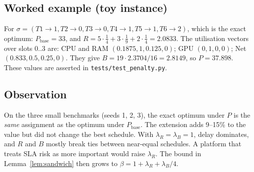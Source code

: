 \subsection{Worked example (toy instance)}
For $\sigma = (T1{\to}1, T2{\to}0, T3{\to}0, T4{\to}1, T5{\to}1, T6{\to}2)$,
which is the exact optimum:
$P_{\text{base}} = 33$, and
$R = 5\cdot\tfrac14 + 3\cdot\tfrac19 + 2\cdot\tfrac14 = 2.0833$.
The utilisation vectors over slots $0..3$ are: CPU and RAM
$(0.1875, 1, 0.125, 0)$; GPU $(0,1,0,0)$; Net $(0.833, 0.5, 0.25, 0)$.
They give $B = 19 \cdot 2.3704/16 = 2.8149$, so $P = 37.898$. These values
are asserted in \texttt{tests/test\_penalty.py}.

\subsection{Observation}
On the three small benchmarks (seeds 1, 2, 3), the exact optimum under $P$ is
the \emph{same} assignment as the optimum under $P_{\text{base}}$. The
extension adds 9--15\% to the value but did not change the best schedule.
With $\lambda_R=\lambda_B=1$, delay dominates, and $R$ and $B$ mostly break
ties between near-equal schedules. A platform that treats SLA risk as more
important would raise $\lambda_R$. The bound in Lemma~\ref{lem:sandwich}
then grows to $\beta = 1+\lambda_R+\lambda_B/4$.
